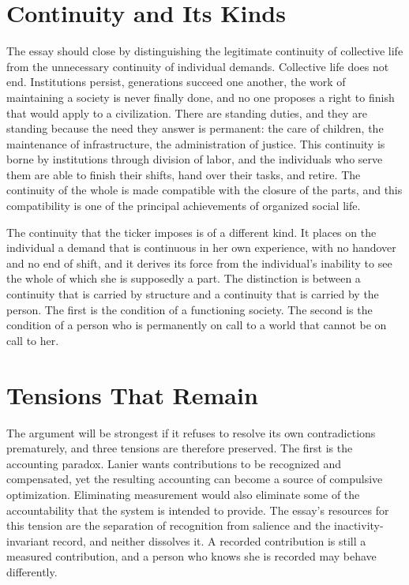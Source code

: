 \documentclass[11pt]{report}
\theoremstyle{definition}
\theoremstyle{remark}
\begin{document}
\section{Continuity and Its Kinds}

The essay should close by distinguishing the legitimate continuity of collective life from the unnecessary continuity of individual demands. Collective life does not end. Institutions persist, generations succeed one another, the work of maintaining a society is never finally done, and no one proposes a right to finish that would apply to a civilization. There are standing duties, and they are standing because the need they answer is permanent: the care of children, the maintenance of infrastructure, the administration of justice. This continuity is borne by institutions through division of labor, and the individuals who serve them are able to finish their shifts, hand over their tasks, and retire. The continuity of the whole is made compatible with the closure of the parts, and this compatibility is one of the principal achievements of organized social life.

The continuity that the ticker imposes is of a different kind. It places on the individual a demand that is continuous in her own experience, with no handover and no end of shift, and it derives its force from the individual's inability to see the whole of which she is supposedly a part. The distinction is between a continuity that is carried by structure and a continuity that is carried by the person. The first is the condition of a functioning society. The second is the condition of a person who is permanently on call to a world that cannot be on call to her.

\section{Tensions That Remain}

The argument will be strongest if it refuses to resolve its own contradictions prematurely, and three tensions are therefore preserved. The first is the accounting paradox. Lanier wants contributions to be recognized and compensated, yet the resulting accounting can become a source of compulsive optimization. Eliminating measurement would also eliminate some of the accountability that the system is intended to provide. The essay's resources for this tension are the separation of recognition from salience and the inactivity-invariant record, and neither dissolves it. A recorded contribution is still a measured contribution, and a person who knows she is recorded may behave differently.
\end{document}
